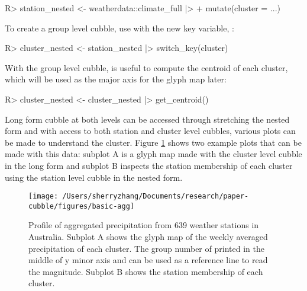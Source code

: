 \documentclass[
]{jss}
\begin{document}
\begin{CodeChunk}
\begin{CodeInput}
R> station_nested <- weatherdata::climate_full |> 
+   mutate(cluster = ...)
\end{CodeInput}
\end{CodeChunk}

To create a group level cubble, use  with the new key variable, :

\begin{CodeChunk}
\begin{CodeInput}
R> cluster_nested <- station_nested |> switch_key(cluster) 
\end{CodeInput}
\end{CodeChunk}

With the group level cubble,  is useful to compute the centroid of each cluster, which will be used as the major axis for the glyph map later:

\begin{CodeChunk}
\begin{CodeInput}
R> cluster_nested <- cluster_nested |> get_centroid()
\end{CodeInput}
\end{CodeChunk}

Long form cubble at both levels can be accessed through stretching the nested form and with access to both station and cluster level cubbles, various plots can be made to understand the cluster. Figure \ref{fig:basic-agg} shows two example plots that can be made with this data: subplot A is a glyph map made with the cluster level cubble in the long form and subplot B inspects the station membership of each cluster using the station level cubble in the nested form.

\begin{CodeChunk}
\begin{figure}

{\centering \texttt{[image: /Users/sherryzhang/Documents/research/paper-cubble/figures/basic-agg]} 

}

\caption[Profile of aggregated precipitation from 639 weather stations in Australia]{Profile of aggregated precipitation from 639 weather stations in Australia. Subplot A shows the glyph map of the weekly averaged precipitation of each cluster. The group number of printed in the middle of y minor axis and can be used as a reference line to read the magnitude. Subplot B shows the station membership of each cluster.}\label{fig:basic-agg}
\end{figure}
\end{CodeChunk}
\end{document}
